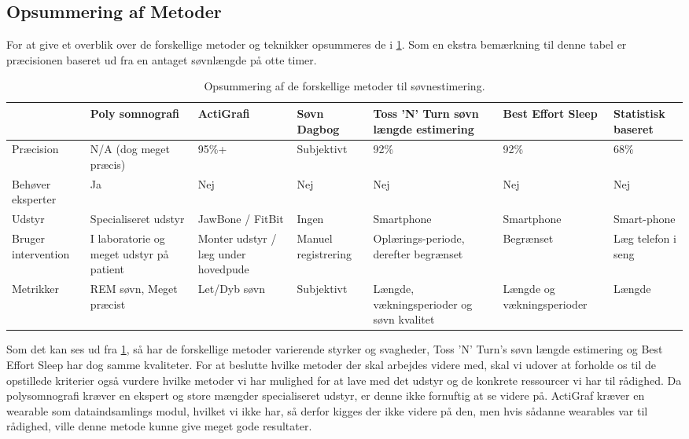\subsection{Opsummering af Metoder}
For at give et overblik over de forskellige metoder og teknikker opsummeres de i \cref{tab:opsummeringMetoder}.
Som en ekstra bemærkning til denne tabel er præcisionen baseret ud fra en antaget søvnlængde på otte timer. 

\begin{table}[h]
\begin{tabular}{|p{2cm}|p{2cm}|p{2cm}|p{2cm}|p{2cm}|p{2cm}|p{1.5cm}|}
\hline & Poly somnografi & ActiGrafi & Søvn Dagbog & Toss 'N' Turn søvn længde estimering & Best Effort Sleep  & Statistisk baseret\\ 
\hline Præcision & N/A (dog meget præcis) & 95\%+ & Subjektivt & 92\% & 92\% & 68\%\\ 
\hline Behøver eksperter & Ja & Nej & Nej & Nej & Nej & Nej \\ 
\hline Udstyr & Specialiseret udstyr & JawBone / FitBit & Ingen & Smartphone & Smartphone & Smart-phone \\ 
\hline Bruger intervention	& I laboratorie og meget udstyr på patient	& Monter udstyr / læg under hovedpude & Manuel registrering  & Oplærings-periode, derefter begrænset & Begrænset & Læg telefon i seng \\ 
\hline Metrikker & REM søvn, Meget præcist	& Let/Dyb søvn & Subjektivt & Længde, vækningsperioder og søvn kvalitet & Længde og vækningsperioder & Længde \\ 
\hline 
\end{tabular}
\caption{Opsummering af de forskellige metoder til søvnestimering.}
\label{tab:opsummeringMetoder}
\end{table}
Som det kan ses ud fra \cref{tab:opsummeringMetoder}, så har de forskellige metoder varierende styrker og svagheder, Toss 'N' Turn's søvn længde estimering og Best Effort Sleep har dog samme kvaliteter.
For at beslutte hvilke metoder der skal arbejdes videre med, skal vi udover at forholde os til de opstillede kriterier også vurdere hvilke metoder vi har mulighed for at lave med det udstyr og de konkrete ressourcer vi har til rådighed.
Da polysomnografi kræver en ekspert og store mængder specialiseret udstyr, er denne ikke fornuftig at se videre på.
ActiGraf kræver en wearable som dataindsamlings modul, hvilket vi ikke har, så derfor kigges der ikke videre på den, men hvis sådanne wearables var til rådighed, ville denne metode kunne give meget gode resultater.

